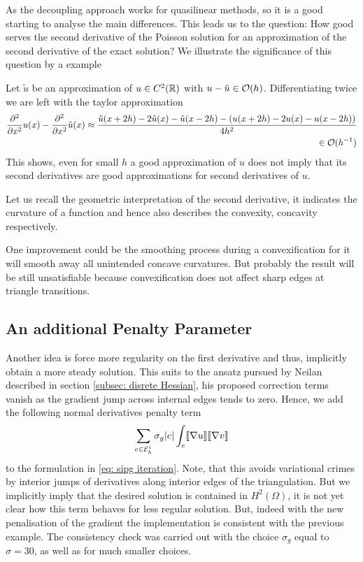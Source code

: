 As the decoupling approach works for quasilinear methods, so it is a good starting to analyse the main differences. This leads us to the question: How good serves the second derivative of the Poisson solution for an approximation of the second derivative of the exact solution?
We illustrate the significance of this question by a example
\begin{example}
	Let $\tilde u$ be an approximation of $u\in C^2(\mathbb{R})$ with $u-\tilde u \in \mathcal{O}(h)$. 
	Differentiating twice we are left with the taylor approximation
	\begin{align*}
		\frac {\partial^2} {\partial {x}^2} u(x)-\frac {\partial^2} {\partial {x}^2} \tilde u(x) \approx \frac{\tilde u(x+2h) - 2\tilde u(x) - \tilde u(x-2h) - (u(x+2h) - 2u(x) - u(x-2h))} {4h^2} \\
		 \in \mathcal{O}(h^{-1})
	\end{align*}
	This shows, even for small $h$ a good approximation of $u$ does not imply that its second derivatives are good approximations for second derivatives of $u$.
\end{example}

Let us recall the geometric interpretation of the second derivative, it indicates the curvature of a function and hence also describes the convexity, concavity respectively.

One improvement could be the smoothing process during a convexification for it will smooth away all unintended concave curvatures. But probably the result will be still unsatisfiable because convexification does not affect sharp edges at triangle transitions.

\subsection{An additional Penalty Parameter}
Another idea is force more regularity on the first derivative and thus, implicitly obtain a more steady solution. This suits to the ansatz pursued by Neilan described in section \ref{subsec: disrete Hessian}, his proposed correction terms vanish as the gradient jump across internal edges tends to zero.
Hence, we add the following normal derivatives penalty term 
\begin{align}
	\sum_{e \in \mathcal{E}_h^i} \sigma_g |e |\int_e \llbracket  \nabla u \rrbracket \llbracket \nabla v \rrbracket \label{eq: grad penalty term}
\end{align}
to the formulation in \eqref{eq: sipg iteration}.
Note, that this avoids variational crimes by interior jumps of derivatives along interior edges of the triangulation. But we implicitly imply that the desired solution is contained in $H^2(\Omega)$, it is not yet clear how this term behaves for less regular solution.
But, indeed with the new penalisation of the gradient the implementation is consistent with the previous example. The consistency check was carried out with the choice $\sigma_g$ equal to $\sigma=30$, as well as for much smaller choices.

